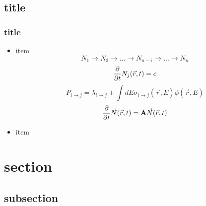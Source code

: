 \documentclass[10pt]{beamer}
\begin{document}
\subsection{title}
\begin{frame}
\frametitle{title}
\begin{itemize}
\item item
\begin{equation*}
N_1 \rightarrow N_2 \rightarrow ...  \rightarrow N_{n-i} \rightarrow ...  \rightarrow N_{n}
\end{equation*}
\begin{equation*}
  {\partial \over \partial t} N_j(\vec{r}, t) = c
\end{equation*}
\begin{equation*}
  P_{i \rightarrow j} = \lambda_{i \rightarrow j} + \int dE \sigma_{i \rightarrow j}(\vec{r}, E) \phi(\vec{r}, E) 
\end{equation*}
\begin{equation*}
  {\partial \over \partial t}\vec{N}(\vec{r}, t) = \bold{A}\vec{N}(\vec{r}, t)
\end{equation*}
\item item
\end{itemize}
\end{frame}

\section{section}

\subsection{subsection}
\end{document}
